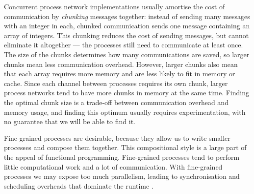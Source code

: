 Concurrent process network implementations usually amortise the cost of communication by \emph{chunking} messages together: instead of sending many messages with an integer in each, chunked communication sends one message containing an array of integers.
This chunking reduces the cost of sending messages, but cannot eliminate it altogether --- the processes still need to communicate at least once.
The size of the chunks determines how many communications are saved, so larger chunks mean less communication overhead.
However, larger chunks also mean that each array requires more memory and are less likely to fit in memory or cache.
Since each channel between processes requires its own chunk, larger process networks tend to have more chunks in memory at the same time.
Finding the optimal chunk size is a trade-off between communication overhead and memory usage, and finding this optimum usually requires experimentation, with no guarantee that we will be able to find it.

Fine-grained processes are desirable, because they allow us to write smaller processes and compose them together.
This compositional style is a large part of the appeal of functional programming.
Fine-grained processes tend to perform little computational work and a lot of communication.
With fine-grained processes we may expose too much parallelism, leading to synchronisation and scheduling overheads that dominate the runtime \cite{chen1990impact}.




